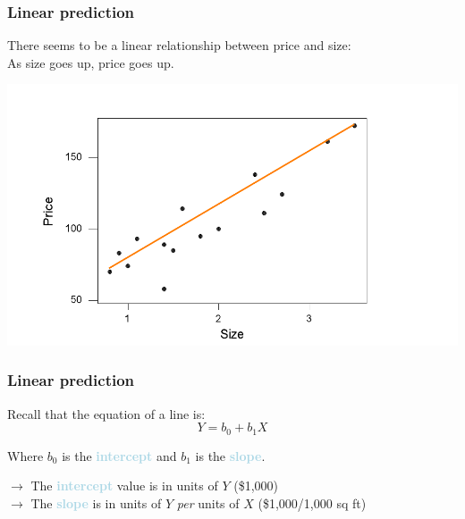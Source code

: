 \documentclass{beamer}
\newcommand{\lb}[1]{\textcolor{lightblue}{#1}}
\newcommand{\rd}{\color{burntorange}}
\newcommand{\bk}{\color{black}}
\newcommand{\sk}{\vspace{.5cm}}
\begin{document}
\begin{frame}
\frametitle{Linear prediction}

\vspace{3mm}
There seems to be a linear relationship between 
price and size:\\ \vspace{3mm}
\centering \rd As size goes up, price goes up. \bk

\vspace{-9mm}
\begin{center}\includegraphics[scale=0.68]{figures/eyeball.pdf}\end{center}


\end{frame}

\begin{frame}
\frametitle{Linear prediction} \vspace{-0.5cm}

Recall that the equation of a line is: \vspace{3mm}
\[
				Y = b_0 + b_1 X
\]

\vspace{3mm}
Where  $b_0$ is the \lb{ \bf intercept} \bk and $b_1$ is the \lb{ \bf slope}\bk.

\sk
\sk
$\rightarrow$ The \lb{\bf intercept} value is in  units of $Y$ (\$1,000)\\ \sk
$\rightarrow$ The \lb{\bf slope} is in units of $Y$ {\it per} units of $X$ (\$1,000/1,000 sq ft)

\end{frame}

\end{document}
